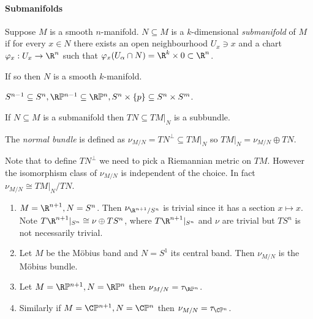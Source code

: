\documentclass[a4paper]{article}
\renewcommand*{\P}{\mathbb{P}}
\begin{document}
\paragraph{Submanifolds}

\begin{definition}[submanifold]
  Suppose \(M\) is a smooth \(n\)-manifold. \(N \subseteq M\) is a \(k\)-dimensional \emph{submanifold} of \(M\) if for every \(x \in N\) there exists an open neighbourhood \(U_x \ni x\) and a chart \(\varphi_x: U_x \to \R^n\) such that \(\varphi_x(U_\alpha \cap N) = \R^k \times 0 \subset \R^n\).
\end{definition}

If so then \(N\) is a smooth \(k\)-manifold.

\begin{eg}
  \(S^{n - 1} \subseteq S^n, \R\P^{n - 1} \subseteq \R\P^n, S^n \times \{p\} \subseteq S^n \times S^m\).
\end{eg}

If \(N \subseteq M\) is a submanifold then \(TN \subseteq TM|_N\) is a subbundle.

\begin{definition}
  The \emph{normal bundle} is defined as \(\nu_{M/N} = TN^\perp \subseteq TM|_N\) so \(TM|_N = \nu_{M/N} \oplus TN\).
\end{definition}

Note that to define \(TN^\perp\) we need to pick a Riemannian metric on \(TM\). However the isomorphism class of \(\nu_{M/N}\) is independent of the choice. In fact \(\nu_{M/N} \cong TM|_N/TN\).

\begin{ex}\leavevmode
  \begin{enumerate}
  \item \(M = \R^{n + 1}, N = S^n\). Then \(\nu_{\R^{n + 1}/S^n}\) is trivial since it has a section \(x \mapsto x\). Note \(T\R^{n + 1}|_{S^n} \cong \nu \oplus TS^n\), where \(T\R^{n + 1}|_{S^n}\) and \(\nu\) are trivial but \(TS^n\) is not necessarily trivial.
  \item Let \(M\) be the Möbius band and \(N = S^1\) its central band. Then \(\nu_{M/N}\) is the Möbius bundle.
  \item Let \(M = \R\P^{n + 1}, N = \R\P^n\) then \(\nu_{M/N} = \tau_{\R\P^n}\).
  \item Similarly if \(M = \C\P^{n + 1}, N = \C\P^n\) then \(\nu_{M/N} = \tau_{\C\P^n}\).
  \end{enumerate}
\end{ex}
\end{document}
